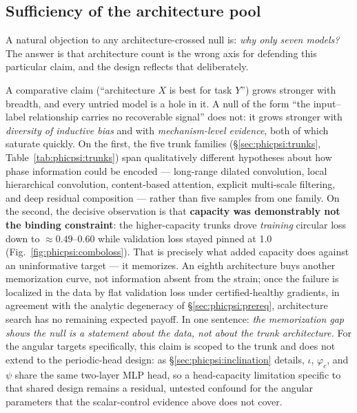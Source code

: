 \subsection{Sufficiency of the architecture pool}
\label{sec:phicpsi:pool}

A natural objection to any architecture-crossed null is: \emph{why only seven models?}
The answer is that architecture count is the wrong axis for defending this particular claim, and the design reflects that deliberately.

A comparative claim (``architecture $X$ is best for task $Y$'') grows stronger with breadth, and every untried model is a hole in it.
A null of the form ``the input--label relationship carries no recoverable signal'' does not: it grows stronger with \emph{diversity of inductive bias} and with \emph{mechanism-level evidence}, both of which saturate quickly.
On the first, the five trunk families (\S\ref{sec:phicpsi:trunks}, Table~\ref{tab:phicpsi:trunks}) span qualitatively different hypotheses about how phase information could be encoded --- long-range dilated convolution, local hierarchical convolution, content-based attention, explicit multi-scale filtering, and deep residual composition --- rather than five samples from one family.
On the second, the decisive observation is that \textbf{capacity was demonstrably not the binding constraint}: the higher-capacity trunks drove \emph{training} circular loss down to ${\approx}0.49$--$0.60$ while validation loss stayed pinned at 1.0 (Fig.~\ref{fig:phicpsi:comboloss}).
That is precisely what added capacity does against an uninformative target --- it memorizes.
An eighth architecture buys another memorization curve, not information absent from the strain; once the failure is localized in the data by flat validation loss under certified-healthy gradients, in agreement with the analytic degeneracy of \S\ref{sec:phicpsi:prereq}, architecture search has no remaining expected payoff.
In one sentence: \emph{the memorization gap shows the null is a statement about the data, not about the trunk architecture.}
For the angular targets specifically, this claim is scoped to the trunk and does not extend to the periodic-head design: as \S\ref{sec:phicpsi:inclination} details, $\iota$, $\varphi_c$, and $\psi$ share the same two-layer MLP head, so a head-capacity limitation specific to that shared design remains a residual, untested confound for the angular parameters that the scalar-control evidence above does not cover.

